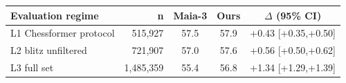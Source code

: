 \begin{tabular}{lrccc}
\hline
\textbf{Evaluation regime} & \textbf{n} & \textbf{Maia-3} & \textbf{Ours} & $\Delta$ (95\% CI) \\
\hline
L1 Chessformer protocol & 515,927 & 57.5 & 57.9 & +0.43 [+0.35,+0.50] \\
L2 blitz unfiltered & 721,907 & 57.0 & 57.6 & +0.56 [+0.50,+0.62] \\
L3 full set & 1,485,359 & 55.4 & 56.8 & +1.34 [+1.29,+1.39] \\
\hline
\end{tabular}
